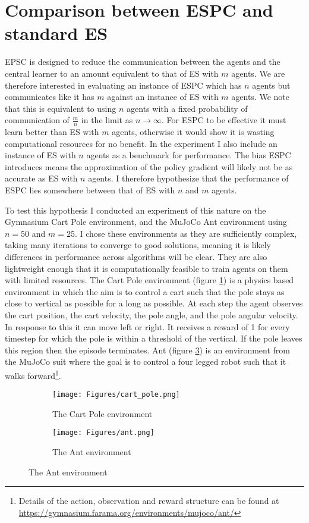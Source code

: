 \section{Comparison between ESPC and standard ES}
EPSC is designed to reduce the communication between the agents and the central learner to an amount equivalent to that of ES with $m$ agents. 
We are therefore interested in evaluating an instance of ESPC which has $n$ agents but communicates like it has $m$ against an instance of ES with $m$ agents. We note that this is equivalent to using $n$ agents with a fixed probability of communication of $\frac{m}{n}$ in the limit as $n \to \infty$.
For ESPC to be effective it must learn better than ES with $m$ agents, otherwise it would show it is wasting computational resources for no benefit. 
In the experiment I also include an instance of ES with $n$ agents as a benchmark for performance. 
The bias ESPC introduces means the approximation of the policy gradient will likely not be as accurate as ES with $n$ agents.
I therefore hypothesize that the performance of ESPC lies somewhere between that of ES with $n$ and $m$ agents.

To test this hypothesis I conducted an experiment of this nature on the Gymnasium Cart Pole environment, and the MuJoCo Ant environment 
using $n=50$ and $m=25$. I chose these environments as they are sufficiently complex, taking many iterations to converge to good solutions, meaning it is likely differences in performance across algorithms will be clear. They are also lightweight enough that it is computationally feasible to train agents on them with limited resources.
The Cart Pole environment (figure \ref{fig:CartPole}) is a physics based environment in which the aim is to control a cart such that the pole stays as close to vertical as possible for a long as possible. 
At each step the agent observes the cart position, the cart velocity, the pole angle, and the pole angular velocity. In response to this it can move left or right. 
It receives a reward of 1 for every timestep for which the pole is within a threshold of the vertical. If the pole leaves this region then the episode terminates. Ant (figure \ref{fig:Ant}) is an environment from the MuJoCo suit where the goal is to control a four legged robot such that it walks forward\footnote{Details of the action, observation and reward structure can be found at \url{https://gymnasium.farama.org/environments/mujoco/ant/}}. 

\begin{figure}
    \centering
    \begin{subfigure}{0.4\textwidth}
        \centering
        \texttt{[image: Figures/cart\_pole.png]}
        \caption{The Cart Pole environment}
        \label{fig:CartPole}
    \end{subfigure}
    \begin{subfigure}{0.4\textwidth}
        \centering
        \texttt{[image: Figures/ant.png]}
        \caption{The Ant environment}
        \label{fig:Ant}
    \end{subfigure}
\end{figure}

